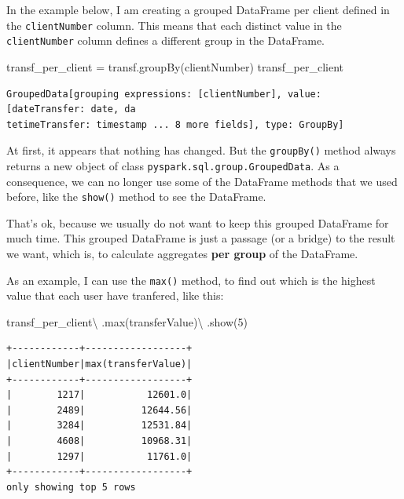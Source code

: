 \documentclass[
  11pt,
  letterpaper,
  DIV=11,
  numbers=noendperiod]{scrreprt}
\newenvironment{Shaded}{\begin{snugshade}}{\end{snugshade}}
\newcommand{\BuiltInTok}[1]{\textcolor[rgb]{0.00,0.23,0.31}{#1}}
\newcommand{\DecValTok}[1]{\textcolor[rgb]{0.68,0.00,0.00}{#1}}
\newcommand{\NormalTok}[1]{\textcolor[rgb]{0.00,0.23,0.31}{#1}}
\newcommand{\OperatorTok}[1]{\textcolor[rgb]{0.37,0.37,0.37}{#1}}
\newcommand{\StringTok}[1]{\textcolor[rgb]{0.13,0.47,0.30}{#1}}
\begin{document}
In the example below, I am creating a grouped DataFrame per client
defined in the \texttt{clientNumber} column. This means that each
distinct value in the \texttt{clientNumber} column defines a different
group in the DataFrame.

\begin{Shaded}
\begin{Highlighting}[]
\NormalTok{transf\_per\_client }\OperatorTok{=}\NormalTok{ transf.groupBy(}\StringTok{\textquotesingle{}clientNumber\textquotesingle{}}\NormalTok{)}
\NormalTok{transf\_per\_client}
\end{Highlighting}
\end{Shaded}

\begin{verbatim}
GroupedData[grouping expressions: [clientNumber], value: [dateTransfer: date, da
tetimeTransfer: timestamp ... 8 more fields], type: GroupBy]
\end{verbatim}

At first, it appears that nothing has changed. But the
\texttt{groupBy()} method always returns a new object of class
\texttt{pyspark.sql.group.GroupedData}. As a consequence, we can no
longer use some of the DataFrame methods that we used before, like the
\texttt{show()} method to see the DataFrame.

That's ok, because we usually do not want to keep this grouped DataFrame
for much time. This grouped DataFrame is just a passage (or a bridge) to
the result we want, which is, to calculate aggregates \textbf{per group}
of the DataFrame.

As an example, I can use the \texttt{max()} method, to find out which is
the highest value that each user have tranfered, like this:

\begin{Shaded}
\begin{Highlighting}[]
\NormalTok{transf\_per\_client}\OperatorTok{\textbackslash{}}
\NormalTok{  .}\BuiltInTok{max}\NormalTok{(}\StringTok{\textquotesingle{}transferValue\textquotesingle{}}\NormalTok{)}\OperatorTok{\textbackslash{}}
\NormalTok{  .show(}\DecValTok{5}\NormalTok{)}
\end{Highlighting}
\end{Shaded}

\begin{verbatim}
+------------+------------------+
|clientNumber|max(transferValue)|
+------------+------------------+
|        1217|           12601.0|
|        2489|          12644.56|
|        3284|          12531.84|
|        4608|          10968.31|
|        1297|           11761.0|
+------------+------------------+
only showing top 5 rows
\end{verbatim}
\end{document}
